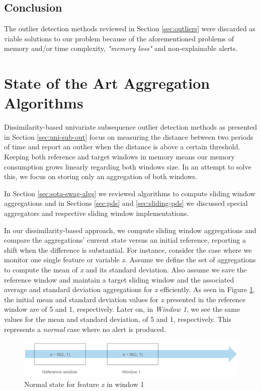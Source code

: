 \subsection*{Conclusion}
The outlier detection methods reviewed in Section \ref{sec:outliers} were discarded as viable solutions to our problem because of the aforementioned problems of memory and/or time complexity, \textit{"memory loss"} and non-explainable alerts.

\section{State of the Art Aggregation Algorithms}
Dissimilarity-based univariate subsequence outlier detection methods as presented in Section \ref{sec:uni-sub-out} focus on measuring the distance between two periods of time and report an outlier when the distance is above a certain threshold. Keeping both reference and target windows in memory means our memory consumption grows linearly regarding both windows size. In an attempt to solve this, we focus on storing only an aggregation of both windows. 

In Section \ref{sec:sota-swag-algs} we reviewed algorithms to compute sliding window aggregations and in Sections \ref{sec:pds} and \ref{sec:sliding-pds} we discussed special aggregators and respective sliding window implementations. 

In our dissimilarity-based approach, we compute sliding window aggregations and compare the aggregations’ current state versus an initial reference, reporting a shift when the difference is substantial. For instance, consider the case where we monitor one single feature or variable \textit{x}. Assume we define the set of aggregations to compute the mean of \textit{x} and its standard deviation. Also assume we save the reference window and maintain a target sliding window and the associated average and standard deviation aggregations for \textit{x} efficiently. As seen in Figure \ref{fig:approach2-initial-state}, the initial mean and standard deviation values for \textit{x} presented in the reference window are of 5 and 1, respectively. Later on, in \textit{Window 1}, we see the same values for the mean and standard deviation, of 5 and 1, respectively. This represents a \textit{normal} case where no alert is produced.

\begin{figure}[!htb]
    \begin{center}
      \includegraphics[scale=0.65]{figures/approach2-normality.png}
      \caption[]{Normal state for feature \textit{x} in window 1}
      \label{fig:approach2-initial-state}
    \end{center}
\end{figure}


